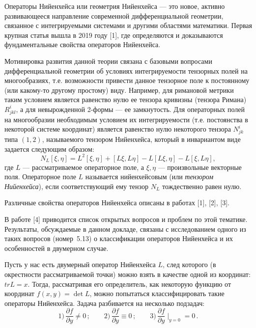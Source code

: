 \documentclass{vzmsthesis}
\begin{document}

\vzmscaption

Операторы Нийенхейса или геометрия Нийенхейса --- это новое, активно развивающееся направление современной дифференциальной геометрии, связанное с интегрируемыми системами и другими областями математики. 
Первая крупная статья вышла в 2019 году [1], где определяются и доказываются фундаментальные свойства операторов Нийенхейса. 

Мотивировка развития данной теории связана с базовыми вопросами дифференциальной геометрии об условиях интегрируемости тензорных полей на многообразиях, т.е. возможности привести данное
тензорное поле к постоянному (или какому-то другому простому) виду. Например, для римановой метрики таким условием является равенство нулю ее тензора кривизны (тензора Римана) $R^i_{jkl}$,
а для невырожденной 2-формы --- ее замкнутость. Для операторных полей на многообразии необходимым условием их интегрируемости (т.е. постоянства в некоторой системе координат) является 
равенство нулю некоторого тензора $N^i_{jk}$ типа $(1,2)$, называемого тензором Нийенхейса, который в инвариантом виде задается следующим образом:
\begin{equation*}
N_L [\xi, \eta] = L^2[\xi, \eta] + [L \xi, L \eta] - L[L \xi, \eta] - L[\xi, L \eta],
\end{equation*}
где $L$ --- рассматриваемое операторное поле, а $\xi,\eta$ --- произвольные векторные поля. Операторное поле $L$ называется нийенхейсовым (или \textit{тензором Нийенхейса}), если 
соответствующий ему тензор $N_L$ тождественно равен нулю. 

Различные свойства операторов Нийенхейса описаны в работах [1], [2], [3]. 

В работе [4] приводится список открытых вопросов и проблем по этой тематике. Результаты, обсуждаемые в данном докладе, связаны с исследованием одного из таких вопросов (номер~5.13) 
о классификации операторов Нийенхейса и их особенностей в двумерном случае. 

Пусть у нас есть двумерный оператор Нийенхейса $L$, след которого (в окрестности рассматриваемой точки) можно взять в качестве одной из координат: $tr L = x$. 
Тогда, рассматривая его определитель, как некоторую функцию от координат $f(x,y)=\det L$, можно попытаться классифицировать такие операторы Нийенхейса. 
Задача разбивается на несколько подзадач: 
%
$$
1)\,\frac{\partial f}{\partial y} \neq 0    \,;\qquad
2)\,\frac{\partial f}{\partial y} \equiv 0  \,;\qquad
3)\,\frac{\partial f}{\partial y} \mid_{y = 0} = 0\,.
$$
\end{document}
